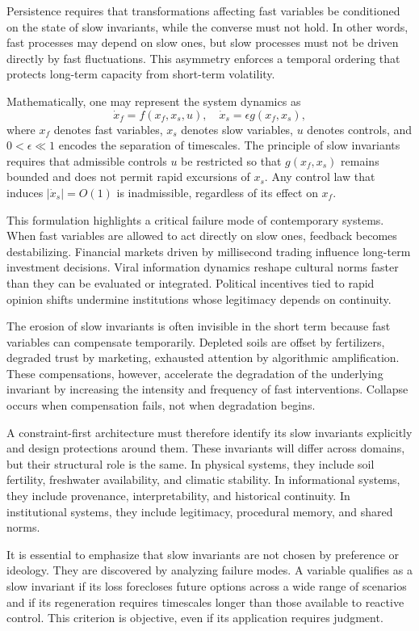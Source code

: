 \documentclass[12pt,oneside]{book}
\begin{document}
Persistence requires that transformations affecting fast variables be conditioned on the state of slow invariants, while the converse must not hold. In other words, fast processes may depend on slow ones, but slow processes must not be driven directly by fast fluctuations. This asymmetry enforces a temporal ordering that protects long-term capacity from short-term volatility.

Mathematically, one may represent the system dynamics as
\[
\dot{x}_f = f(x_f, x_s, u),
\quad
\dot{x}_s = \epsilon g(x_f, x_s),
\]
where \(x_f\) denotes fast variables, \(x_s\) denotes slow variables, \(u\) denotes controls, and \(0 < \epsilon \ll 1\) encodes the separation of timescales. The principle of slow invariants requires that admissible controls \(u\) be restricted so that \(g(x_f, x_s)\) remains bounded and does not permit rapid excursions of \(x_s\). Any control law that induces \(|\dot{x}_s| = O(1)\) is inadmissible, regardless of its effect on \(x_f\).

This formulation highlights a critical failure mode of contemporary systems. When fast variables are allowed to act directly on slow ones, feedback becomes destabilizing. Financial markets driven by millisecond trading influence long-term investment decisions. Viral information dynamics reshape cultural norms faster than they can be evaluated or integrated. Political incentives tied to rapid opinion shifts undermine institutions whose legitimacy depends on continuity.

The erosion of slow invariants is often invisible in the short term because fast variables can compensate temporarily. Depleted soils are offset by fertilizers, degraded trust by marketing, exhausted attention by algorithmic amplification. These compensations, however, accelerate the degradation of the underlying invariant by increasing the intensity and frequency of fast interventions. Collapse occurs when compensation fails, not when degradation begins.

A constraint-first architecture must therefore identify its slow invariants explicitly and design protections around them. These invariants will differ across domains, but their structural role is the same. In physical systems, they include soil fertility, freshwater availability, and climatic stability. In informational systems, they include provenance, interpretability, and historical continuity. In institutional systems, they include legitimacy, procedural memory, and shared norms.

It is essential to emphasize that slow invariants are not chosen by preference or ideology. They are discovered by analyzing failure modes. A variable qualifies as a slow invariant if its loss forecloses future options across a wide range of scenarios and if its regeneration requires timescales longer than those available to reactive control. This criterion is objective, even if its application requires judgment.
\end{document}
